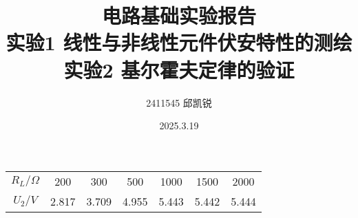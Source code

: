 \documentclass{article}
\title{{电路基础实验报告}\\{\small 实验1 线性与非线性元件伏安特性的测绘}\\{\small 实验2 基尔霍夫定律的验证}}
\author{2411545 邱凯锐}
\date{2025.3.19}
\begin{document}
\maketitle
\begin{table}[]
    \begin{tabular}{ccccccc}
    \hline\hline
    $R_L/\Omega$	&200	&300	&500	&1000	&1500	&2000 \\
    $U_2/V$	        &2.817	&3.709	&4.955	&5.443	&5.442	&5.444 \\ \hline \hline
    
\end{tabular}
    \end{table}
\end{document}

